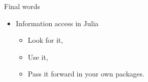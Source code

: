 \documentclass{beamer}
\begin{document}
%
%

\begin{frame}{Final words}
  \begin{itemize}
    \item Information access in Julia
    \begin{itemize}
      \setlength{\itemsep}{3mm}
      \item Look for it,
      \item Use it,
      \item Pass it forward in your own packages.
    \end{itemize}
  \end{itemize}

\end{frame}
\end{document}
